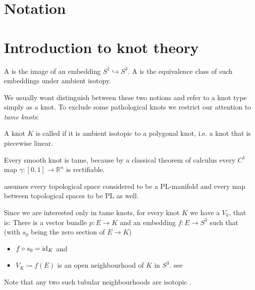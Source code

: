





\tableofcontents

\tableofcontents
\section*{Notation}

\cleardoubleoddemptypage

\setcounter{page}{1}
\setcounter{footnote}{0}

\section{Introduction to knot theory} %
\label{sec:intro_knots}

\begin{definition}
	A  is the image of an embedding $S^1 \hookrightarrow S^3$.
	A  is the equivalence class of such embeddings under ambient isotopy.
\end{definition}

We usually wont distinguish between these two notions and refer to a knot type simply as a knot.
To exclude some pathological knots we restrict our attention to \emph{tame knots}:

\begin{definition}
	A knot $K$ is called  if it is ambient isotopic to a polygonal knot, i.e. a knot that is piecewise linear.
\end{definition}

\begin{example}
	Every smooth knot is tame, because by a classical theorem of calculus every $C^1$ map $\gamma \colon [0,1] \to \mathbb{R}^n$ is rectifiable.
\end{example}

\textcite[p.~9]{morishita} assumes every topological space considered to be a PL-manifold and every map between topological spaces to be PL as well.

Since we are interested only in tame knots, for every knot $K$ we have a  $V_k$, that is: There is a vector bundle $p \colon E \to K$ and an embedding $f \colon E \to S^3$ such that (with $s_0$ being the zero section of $E \to K$)
\begin{itemize}
	\item $f \circ s_0 = {\operatorname{id}_K}$ and
	\item $V_K \coloneqq f(E)$ is an open neighbourhood of $K$ in $S^3$. \hfill see \textcite{hirschDifferential}
\end{itemize}
Note that any two such tubular neighbourhoods are isotopic \cite[Chap.~4, Thm.~5.3]{hirschDifferential}.

